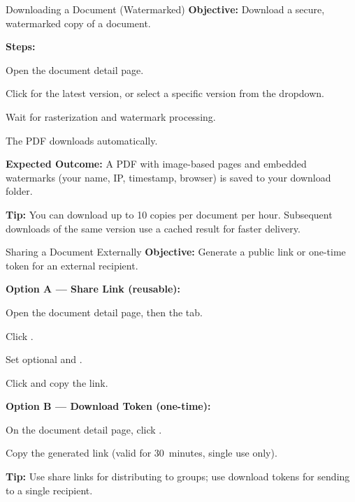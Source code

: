 \begin{ugTask}{Downloading a Document (Watermarked)}
  \textbf{Objective:} Download a secure, watermarked copy of a
  document.

  \textbf{Steps:}
  \begin{ugSteps}
    \item Open the document detail page.
    \item Click  for the latest version,
          or select a specific version from the
           dropdown.
    \item Wait for rasterization and watermark processing.
    \item The PDF downloads automatically.
  \end{ugSteps}

  \textbf{Expected Outcome:} A PDF with image-based pages and
  embedded watermarks (your name, IP, timestamp, browser) is
  saved to your download folder.

  \textbf{Tip:} You can download up to 10 copies per document
  per hour. Subsequent downloads of the same version use a
  cached result for faster delivery.
\end{ugTask}

\vspace{8pt}

\begin{ugTask}{Sharing a Document Externally}
  \textbf{Objective:} Generate a public link or one-time token
  for an external recipient.

  \textbf{Option A --- Share Link (reusable):}
  \begin{ugSteps}
    \item Open the document detail page, then the
           tab.
    \item Click .
    \item Set optional  and
          .
    \item Click  and copy the link.
  \end{ugSteps}

  \textbf{Option B --- Download Token (one-time):}
  \begin{ugSteps}
    \item On the document detail page, click
          .
    \item Copy the generated link (valid for 30~minutes,
          single use only).
  \end{ugSteps}

  \textbf{Tip:} Use share links for distributing to groups;
  use download tokens for sending to a single recipient.
\end{ugTask}


